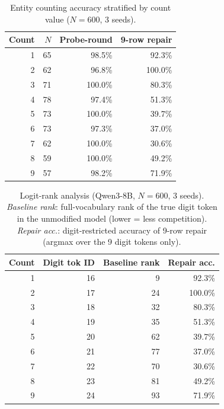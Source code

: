 \documentclass{article}
\begin{document}
\begin{table}[h]
\centering
\small
\caption{Entity counting accuracy stratified by count value ($N=600$, 3 seeds).}
\label{tab:entity_count_stratified}
\begin{tabular}{rrrr}
\toprule
Count & $N$ & Probe-round & 9-row repair \\
\midrule
1 & 65 & 98.5\% & 92.3\% \\
2 & 62 & 96.8\% & 100.0\% \\
3 & 71 & 100.0\% & 80.3\% \\
4 & 78 & 97.4\% & 51.3\% \\
5 & 73 & 100.0\% & 39.7\% \\
6 & 73 & 97.3\% & 37.0\% \\
7 & 62 & 100.0\% & 30.6\% \\
8 & 59 & 100.0\% & 49.2\% \\
9 & 57 & 98.2\% & 71.9\% \\
\bottomrule
\end{tabular}
\end{table}

\begin{table}[h]
\centering
\small
\caption{Logit-rank analysis (Qwen3-8B, $N=600$, 3 seeds). \textit{Baseline rank}: full-vocabulary rank of the true digit token in the unmodified model (lower = less competition). \textit{Repair acc.}: digit-restricted accuracy of 9-row repair (argmax over the 9 digit tokens only).}
\label{tab:logit_rank}
\begin{tabular}{rrrr}
\toprule
Count & Digit tok ID & Baseline rank & Repair acc. \\
\midrule
1 & 16 & 9 & 92.3\% \\
2 & 17 & 24 & 100.0\% \\
3 & 18 & 32 & 80.3\% \\
4 & 19 & 35 & 51.3\% \\
5 & 20 & 62 & 39.7\% \\
6 & 21 & 77 & 37.0\% \\
7 & 22 & 70 & 30.6\% \\
8 & 23 & 81 & 49.2\% \\
9 & 24 & 93 & 71.9\% \\
\bottomrule
\end{tabular}
\end{table}
\end{document}

